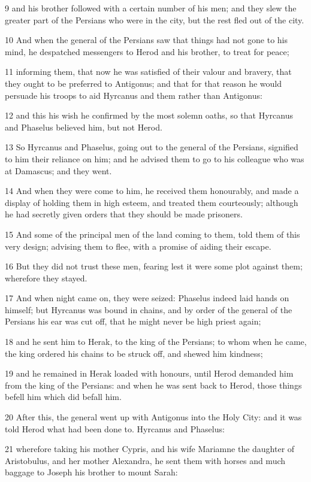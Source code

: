 9 and his brother followed with a certain number of his men; and they slew the greater part of the Persians who were in the city, but the rest fled out of the city. 

10 And when the general of the Persians saw that things had not gone to his mind, he despatched messengers to Herod and his brother, to treat for peace; 

11 informing them, that now he was satisfied of their valour and bravery, that they ought to be preferred to Antigonus; and that for that reason he would persuade his troops to aid Hyrcanus and them rather than Antigonus: 

12 and this his wish he confirmed by the most solemn oaths, so that Hyrcanus and Phaselus believed him, but not Herod. 

13 So Hyrcanus and Phaselus, going out to the general of the Persians, signified to him their reliance on him; and he advised them to go to his colleague who was at Damascus; and they went. 

14 And when they were come to him, he received them honourably, and made a display of holding them in high esteem, and treated them courteously; although he had secretly given orders that they should be made prisoners. 

15 And some of the principal men of the land coming to them, told them of this very design; advising them to flee, with a promise of aiding their escape. 

16 But they did not trust these men, fearing lest it were some plot against them; wherefore they stayed. 

17 And when night came on, they were seized: Phaselus indeed laid hands on himself; but Hyrcanus was bound in chains, and by order of the general of the Persians his ear was cut off, that he might never be high priest again; 

18 and he sent him to Herak, to the king of the Persians; to whom when he came, the king ordered his chains to be struck off, and shewed him kindness; 

19 and he remained in Herak loaded with honours, until Herod demanded him from the king of the Persians: and when he was sent back to Herod, those things befell him which did befall him. 

20 After this, the general went up with Antigonus into the Holy City: and it was told Herod what had been done to. Hyrcanus and Phaselus: 

21 wherefore taking his mother Cypris, and his wife Mariamne the daughter of Aristobulus, and her mother Alexandra, he sent them with horses and much baggage to Joseph his brother to mount Sarah: 

